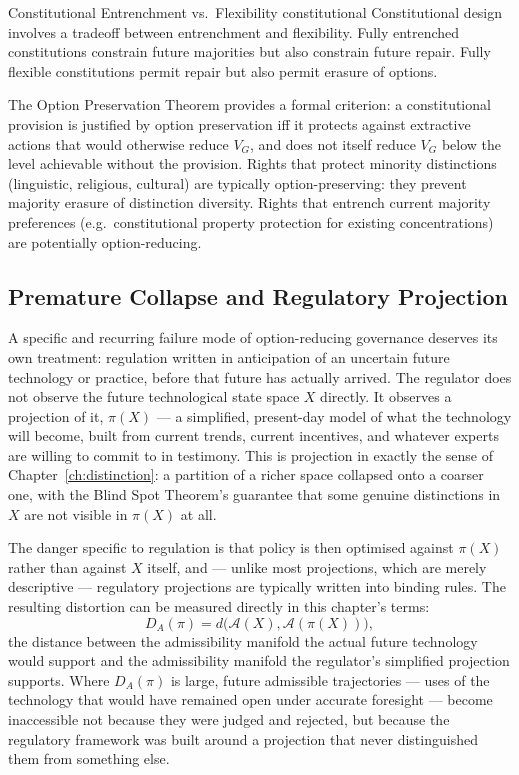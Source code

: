 \documentclass[12pt,twoside,openright]{book}
\newcommand{\adm}{\mathcal{A}}
\begin{document}
\begin{example}{Constitutional Entrenchment vs.\ Flexibility}%
  {constitutional}
  Constitutional design involves a tradeoff between
  entrenchment and flexibility.
  Fully entrenched constitutions constrain future
  majorities but also constrain future repair.
  Fully flexible constitutions permit repair but also
  permit erasure of options.

  The Option Preservation Theorem provides a formal
  criterion: a constitutional provision is justified
  by option preservation iff it protects against
  extractive actions that would otherwise reduce $V_G$,
  and does not itself reduce $V_G$ below the level
  achievable without the provision.
  Rights that protect minority distinctions (linguistic,
  religious, cultural) are typically option-preserving:
  they prevent majority erasure of distinction diversity.
  Rights that entrench current majority preferences
  (e.g.\ constitutional property protection for
  existing concentrations) are potentially option-reducing.
\end{example}

\subsection{Premature Collapse and Regulatory Projection}
\label{sec:ch28-projection}

A specific and recurring failure mode of option-reducing
governance deserves its own treatment: regulation written in
anticipation of an uncertain future technology or practice,
before that future has actually arrived. The regulator does
not observe the future technological state space $X$
directly. It observes a projection of it, $\pi(X)$ ---
a simplified, present-day model of what the technology will
become, built from current trends, current incentives, and
whatever experts are willing to commit to in testimony. This
is projection in exactly the sense of
Chapter~\ref{ch:distinction}: a partition of a richer space
collapsed onto a coarser one, with the Blind Spot Theorem's
guarantee that some genuine distinctions in $X$ are not
visible in $\pi(X)$ at all.

The danger specific to regulation is that policy is then
optimised against $\pi(X)$ rather than against $X$ itself,
and --- unlike most projections, which are merely descriptive
--- regulatory projections are typically written into binding
rules. The resulting distortion can be measured directly in
this chapter's terms:
\[
  D_A(\pi)
  = d\bigl(\adm(X), \adm(\pi(X))\bigr),
\]
the distance between the admissibility manifold the actual
future technology would support and the admissibility
manifold the regulator's simplified projection supports.
Where $D_A(\pi)$ is large, future admissible trajectories ---
uses of the technology that would have remained open under
accurate foresight --- become inaccessible not because they
were judged and rejected, but because the regulatory
framework was built around a projection that never
distinguished them from something else.
\end{document}
